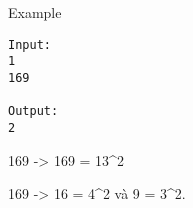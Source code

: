 Example
\begin{verbatim}
Input:
1
169

Output:
2
\end{verbatim}

169 -> 169 = 13^2


169 -> 16 = 4^2 và 9 = 3^2.